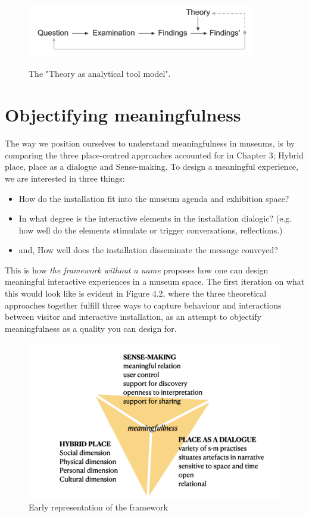\begin{figure}[H]
    \centering
    \includegraphics[width=10cm]{pictures/Theory/analytical_theory.png}
    \caption{The "Theory as analytical tool model".}
    \autocite[p. 133]{beck_examining_2016}
\end{figure}

\section{Objectifying meaningfulness}

The way we position ourselves to understand meaningfulness in museums, is by comparing the three place-centred approaches accounted for in Chapter 3; Hybrid place, place as a dialogue and Sense-making. To design a meaningful experience, we are interested in three things:

\begin{itemize}
    \item How do the installation fit into the museum agenda and exhibition space?
    \item In what degree is the interactive elements in the installation dialogic? (e.g. how well do the elements stimulate or trigger conversations, reflections.)
    \item and, How well does the installation disseminate the message conveyed?
\end{itemize}

This is how \emph{the framework without a name} proposes how one can design meaningful interactive experiences in a museum space. The first iteration on what this would look like is evident in Figure 4.2, where the three theoretical approaches together fulfill three ways to capture behaviour and interactions between visitor and interactive installation, as an attempt to objectify meaningfulness as a quality you can design for. 

\begin{figure}[H]
\centering
\includegraphics[width=12.5cm]{pictures/Theory/triangle_first.png}
\caption{Early representation of the framework}
\end{figure}

